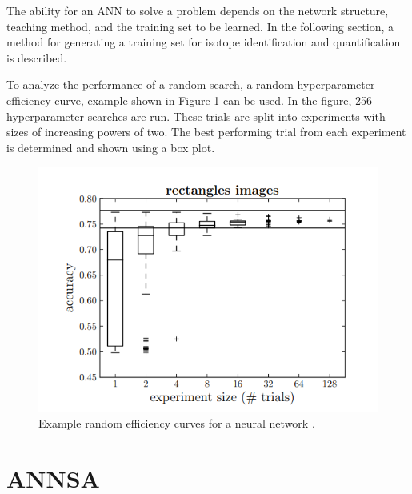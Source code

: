 The ability for an ANN to solve a problem depends on the network structure, teaching method, and the training set to be learned. In the following section, a method for generating a training set for isotope identification and quantification is described.

To analyze the performance of a random search, a random hyperparameter efficiency curve, example shown in Figure \ref{fig:Bergstra_random_efficiency_curve_DNN} can be used. In the figure, 256 hyperparameter searches are run. These trials are split into experiments with sizes of increasing powers of two. The best performing trial from each experiment is determined and shown using a box plot.


\begin{figure}[H]
	\centering
	\includegraphics[width=0.9\linewidth]{model_choice_hyperparameter_search_images/Bergstra12_random_efficiency_curve}
	\caption{Example random efficiency curves for a neural network \cite{Bergstra2012}.}
	\label{fig:Bergstra_random_efficiency_curve_DNN}
\end{figure}

\section{ANNSA}

